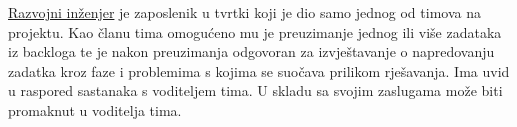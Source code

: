 \par \underline{Razvojni inženjer} je zaposlenik u tvrtki koji je dio samo jednog od timova na projektu. Kao članu tima omogućeno mu je preuzimanje jednog ili više zadataka iz backloga te je nakon preuzimanja odgovoran za izvještavanje o napredovanju zadatka kroz faze i problemima s kojima se suočava prilikom rješavanja. Ima uvid u raspored sastanaka s voditeljem tima. U skladu sa svojim zaslugama može biti promaknut u voditelja tima.




